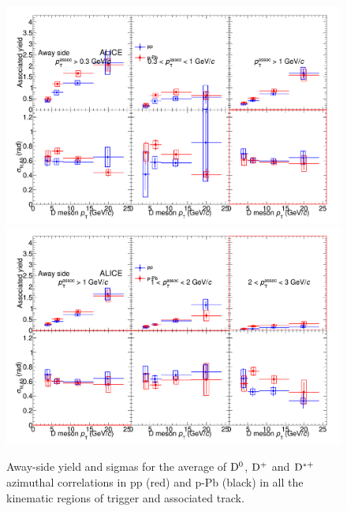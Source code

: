 \begin{figure}
\centering
\includegraphics[width=.95\linewidth]{figures/CfrPPandModels/CompareFitResults_ppVspPb_5TeV_AwaySide_1.png}
\includegraphics[width=.95\linewidth]{figures/CfrPPandModels/CompareFitResults_ppVspPb_5TeV_AwaySide_2.png}
\caption{Away-side yield and sigmas for the average of ${\rm D^0}$, ${\rm D^+}$ and ${\rm D^{*+}}$ azimuthal correlations in pp (red) and p-Pb (black) in all the kinematic regions of trigger and associated track.}
\label{fig:pp-pPb_FitAS}
\end{figure}



